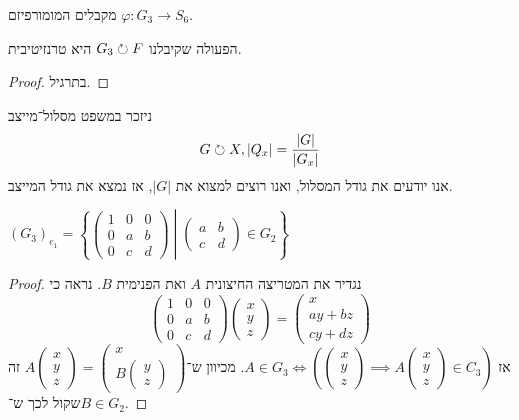 מקבלים המומורפיזם $\varphi : G_3 \to S_6$.
\begin{lemma}
	הפעולה שקיבלנו $G_3 \circlearrowright F$ היא טרנזיטיבית.
\end{lemma}
\begin{proof}
	בתרגיל.
\end{proof}
ניזכר במשפט מסלול־מייצב
\[
	G \circlearrowright X, |Q_x| = \frac{|G|}{|G_x|}
\]
אנו יודעים את גודל המסלול, ואנו רוצים למצוא את $|G|$, אז נמצא את גודל המייצב.
\begin{lemma}
	${(G_3)}_{e_1} = \left\{
		\begin{pmatrix}
			1 & 0 & 0 \\
			0 & a & b \\
			0 & c & d
		\end{pmatrix}
		\middle|
		\begin{pmatrix}
			a & b \\
			c & d
		\end{pmatrix}
		\in G_2
	\right\}$
\end{lemma}
\begin{proof}
	נגדיר את המטריצה החיצונית $A$ ואת הפנימית $B$.
	נראה כי
	\[
		\begin{pmatrix}
			1 & 0 & 0 \\
			0 & a & b \\
			0 & c & d
		\end{pmatrix}
		\begin{pmatrix}
			x \\ y \\ z
		\end{pmatrix}
		=
		\begin{pmatrix}
			x \\
			ay + bz \\
			cy + dz
		\end{pmatrix}
	\]
	אז $A \in G_3 \iff (\begin{pmatrix} x \\ y \\ z \end{pmatrix} \implies A \begin{pmatrix} x \\ y \\ z \end{pmatrix} \in C_3)$.
	מכיוון ש־$A \begin{pmatrix} x \\ y \\ z \end{pmatrix} = \begin{pmatrix}
		x \\
		B \begin{pmatrix}
			y \\ z
		\end{pmatrix}
	\end{pmatrix}$
	זה שקול לכך ש־$B \in G_2$.
\end{proof}

